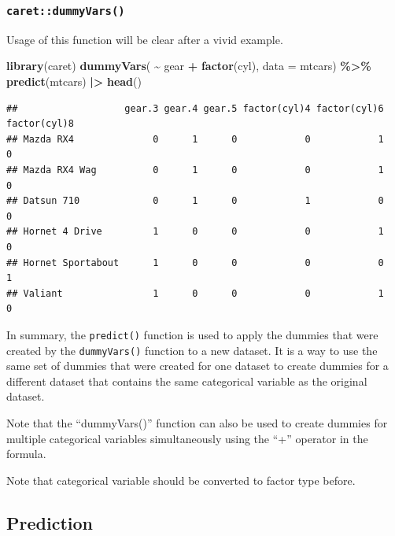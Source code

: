 \documentclass[
]{ctexart}
\newenvironment{Shaded}{\begin{snugshade}}{\end{snugshade}}
\newcommand{\AttributeTok}[1]{\textcolor[rgb]{0.13,0.29,0.53}{#1}}
\newcommand{\FunctionTok}[1]{\textcolor[rgb]{0.13,0.29,0.53}{\textbf{#1}}}
\newcommand{\NormalTok}[1]{#1}
\newcommand{\SpecialCharTok}[1]{\textcolor[rgb]{0.81,0.36,0.00}{\textbf{#1}}}
\begin{document}
\hypertarget{caretdummyvars}{%
\subsubsection{\texorpdfstring{\texttt{caret::dummyVars()}}{caret::dummyVars()}}\label{caretdummyvars}}

Usage of this function will be clear after a vivid example.

\begin{Shaded}
\begin{Highlighting}[]
\FunctionTok{library}\NormalTok{(caret)}
\FunctionTok{dummyVars}\NormalTok{( }\SpecialCharTok{\textasciitilde{}}\NormalTok{ gear }\SpecialCharTok{+} \FunctionTok{factor}\NormalTok{(cyl), }\AttributeTok{data =}\NormalTok{ mtcars) }\SpecialCharTok{\%\textgreater{}\%} 
  \FunctionTok{predict}\NormalTok{(mtcars) }\SpecialCharTok{|\textgreater{}} \FunctionTok{head}\NormalTok{()}
\end{Highlighting}
\end{Shaded}

\begin{verbatim}
##                   gear.3 gear.4 gear.5 factor(cyl)4 factor(cyl)6 factor(cyl)8
## Mazda RX4              0      1      0            0            1            0
## Mazda RX4 Wag          0      1      0            0            1            0
## Datsun 710             0      1      0            1            0            0
## Hornet 4 Drive         1      0      0            0            1            0
## Hornet Sportabout      1      0      0            0            0            1
## Valiant                1      0      0            0            1            0
\end{verbatim}

In summary, the \texttt{predict()} function is used to apply the dummies
that were created by the \texttt{dummyVars()} function to a new dataset.
It is a way to use the same set of dummies that were created for one
dataset to create dummies for a different dataset that contains the same
categorical variable as the original dataset.

Note that the ``dummyVars()'' function can also be used to create
dummies for multiple categorical variables simultaneously using the
``+'' operator in the formula.

Note that categorical variable should be converted to factor type
before.

\hypertarget{prediction}{%
\subsection{Prediction}\label{prediction}}
\end{document}
